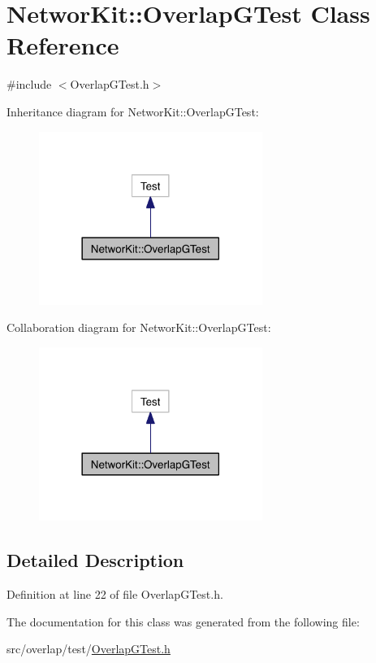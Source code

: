 \hypertarget{class_networ_kit_1_1_overlap_g_test}{\section{Networ\-Kit\-:\-:Overlap\-G\-Test Class Reference}
\label{class_networ_kit_1_1_overlap_g_test}
}


{\ttfamily \#include $<$Overlap\-G\-Test.\-h$>$}



Inheritance diagram for Networ\-Kit\-:\-:Overlap\-G\-Test\-:\nopagebreak
\begin{figure}[H]
\begin{center}
\leavevmode
\includegraphics[width=206pt]{class_networ_kit_1_1_overlap_g_test__inherit__graph}
\end{center}
\end{figure}


Collaboration diagram for Networ\-Kit\-:\-:Overlap\-G\-Test\-:\nopagebreak
\begin{figure}[H]
\begin{center}
\leavevmode
\includegraphics[width=206pt]{class_networ_kit_1_1_overlap_g_test__coll__graph}
\end{center}
\end{figure}


\subsection{Detailed Description}


Definition at line 22 of file Overlap\-G\-Test.\-h.



The documentation for this class was generated from the following file\-:\begin{DoxyCompactItemize}
\item 
src/overlap/test/\hyperlink{_overlap_g_test_8h}{Overlap\-G\-Test.\-h}\end{DoxyCompactItemize}
